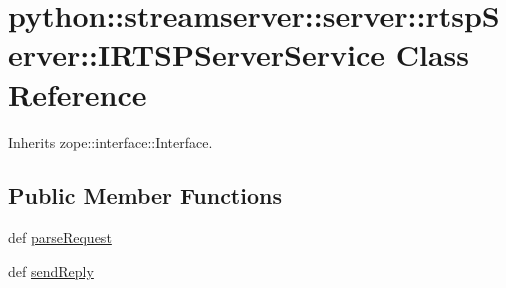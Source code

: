 \hypertarget{classpython_1_1streamserver_1_1server_1_1rtspServer_1_1IRTSPServerService}{
\section{python::streamserver::server::rtspServer::IRTSPServerService Class Reference}
\label{classpython_1_1streamserver_1_1server_1_1rtspServer_1_1IRTSPServerService}
}


Inherits zope::interface::Interface.

\subsection*{Public Member Functions}
\begin{DoxyCompactItemize}
\item 
def \hyperlink{classpython_1_1streamserver_1_1server_1_1rtspServer_1_1IRTSPServerService_a045aabb578b5e8f5db57e6486ed17c69}{parseRequest}
\item 
def \hyperlink{classpython_1_1streamserver_1_1server_1_1rtspServer_1_1IRTSPServerService_a0e8cfc4cfef454e62065afdc67d11b54}{sendReply}
\end{DoxyCompactItemize}


